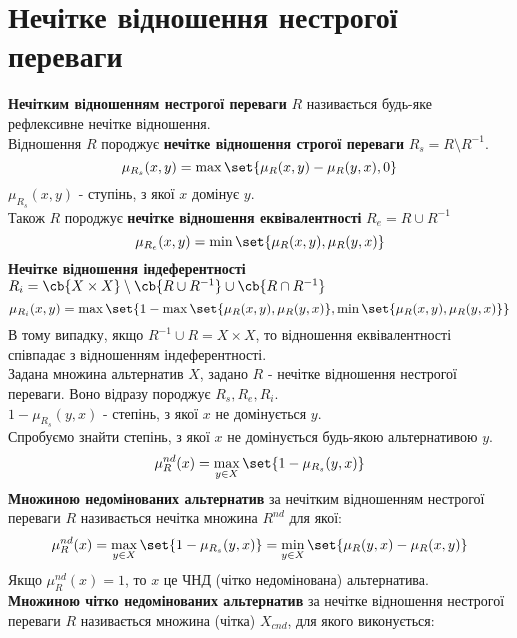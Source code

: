 \section{Нечітке відношення нестрогої переваги} 
\textbf{Нечітким відношенням нестрогої переваги} $R$ називається будь-яке рефлексивне нечітке відношення. \\
Відношення $R$ породжує \textbf{нечітке відношення строгої переваги} $R_s= R\setminus R^{-1}$.
\begin{equation}
\mu_{R_s}(x,y) = \max\set{\mu_R(x,y) - \mu_R(y,x),0}
\end{equation}
$\mu_{R_s}(x,y)$ - ступінь, з якої $x$ домінує $y$.\\
Також $R$ породжує \textbf{нечітке відношення еквівалентності} $R_e = R\cup R^{-1}$\\
\begin{equation}
\mu_{R_e}(x,y) = \min\set{\mu_R(x,y),\mu_R(y,x)}
\end{equation}
\textbf{Нечітке відношення індеферентності} $R_i = \cb{X\times X}\setminus\cb{R\cup R^{-1}}\cup\cb{R\cap R^{-1}}$ 
\begin{equation}
\mu_{R_i} (x,y) = \max\set{1 - \max\set{\mu_R(x,y),\mu_R(y,x)},\min\set{\mu_R(x,y),\mu_R(y,x)}}
\end{equation}	
В тому випадку, якщо $R^{-1}\cup R = X\times X$, то відношення еквівалентності співпадає з відношенням індеферентності.\\
Задана множина альтернатив $X$, задано $R$ - нечітке відношення нестрогої переваги. Воно відразу породжує $R_s,R_e,R_i$.\\
$1-\mu_{R_s}(y,x)$ - степінь, з якої $x$ не домінується $y$.\\
Спробуємо знайти степінь, з якої $x$ не домінується будь-якою альтернативою $y$.\\
\begin{equation}
\mu_R^{nd}(x) = \max\limits_{y\in X} \set{1-\mu_{R_s}(y,x)}
\end{equation}
\textbf{Множиною недомінованих альтернатив} за нечітким відношенням нестрогої переваги $R$ називається нечітка множина $R^{nd}$ для якої:
\begin{equation}
\mu_R^{nd}(x) = \max\limits_{y\in X} \set{1-\mu_{R_s}(y,x)} = \min\limits_{y\in X} \set{\mu_R(y,x) - \mu_R(x,y)}
\end{equation}
Якщо $\mu_R^{nd}(x) = 1$, то $x$ це ЧНД (чітко недомінована) альтернатива.\\
\textbf{Множиною чітко недомінованих альтернатив }за нечітке відношення нестрогої переваги $R$ називається множина (чітка) $X_{cnd}$, для якого виконується:
